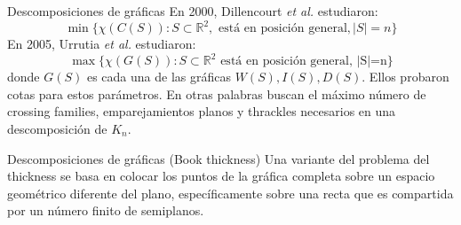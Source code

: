 \begin{frame}{Descomposiciones de gráficas}
		En 2000, Dillencourt \emph{et al.} estudiaron: 
		\[ 
			\min\{ \chi(C(S)): S \subset \mathbb{R}^2,\text{ está en posición general}, |S|=n \}
		\]
		En 2005, Urrutia \emph{et al.} estudiaron: \[\max\{\chi(G(S)): S \subset \mathbb{R}^2 \text{ está en posición general, |S|=n} \}\] donde $G(S)$ es cada una de las gráficas $W(S),I(S),D(S)$. Ellos probaron cotas para estos parámetros. En otras palabras buscan el máximo número de crossing families, emparejamientos planos y thrackles necesarios en una descomposición de $K_n$.
\end{frame}
\begin{frame}{Descomposiciones de gráficas (Book thickness)}
	Una variante del problema del thickness se basa en colocar los puntos de la gráfica completa sobre un espacio geométrico diferente del plano, específicamente sobre una recta que es compartida por un número finito de semiplanos. 
	\begin{center}
	\end{center}
\end{frame}
